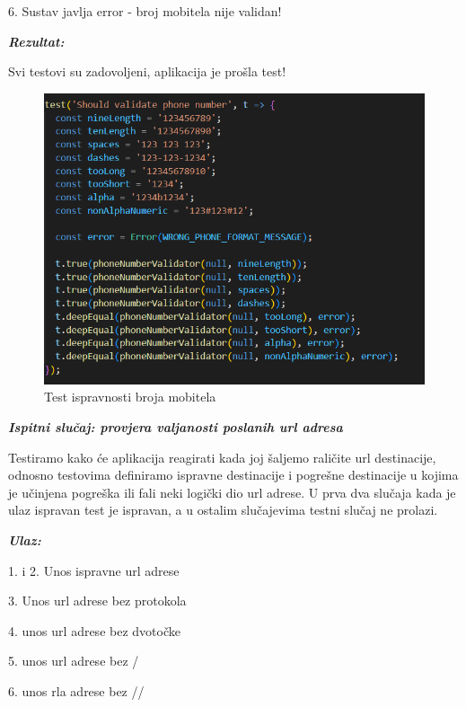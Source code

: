              6. Sustav javlja error - broj mobitela nije validan!

             \textbf{\textit{Rezultat:}}

             Svi testovi su zadovoljeni, aplikacija je prošla test!

\begin{figure}[H]
			\includegraphics[scale=0.5]{slike/numberTest.PNG} %
			\centering
			\caption{Test ispravnosti broja mobitela}
			\label{fig:bbb}
			
		\end{figure}


\textbf{\textit{Ispitni slučaj: provjera valjanosti poslanih url adresa}}

Testiramo kako će aplikacija reagirati kada joj šaljemo raličite url destinacije, odnosno testovima definiramo ispravne destinacije i pogrešne destinacije u kojima je učinjena pogreška ili fali neki logički dio url adrese.
U prva dva slučaja kada je ulaz ispravan test je ispravan, a u ostalim slučajevima testni slučaj ne prolazi.

            \textbf{\textit{Ulaz:}}

             1. i 2. Unos ispravne url adrese     
        
             3. Unos  url adrese bez protokola

	     4. unos url adrese bez dvotočke

	     5. unos url adrese bez /

             6. unos rla adrese bez //

